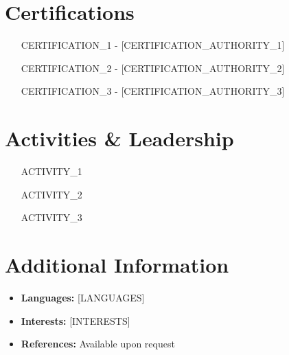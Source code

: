 \documentclass[11pt,a4paper]{article}
\begin{document}
\section{Certifications}
\begin{itemize}[leftmargin=0.2in]
    \item [CERTIFICATION_1] - [CERTIFICATION_AUTHORITY_1]
    \item [CERTIFICATION_2] - [CERTIFICATION_AUTHORITY_2]
    \item [CERTIFICATION_3] - [CERTIFICATION_AUTHORITY_3]
\end{itemize}

\section{Activities \& Leadership}
\begin{itemize}[leftmargin=0.2in]
    \item [ACTIVITY_1]
    \item [ACTIVITY_2]
    \item [ACTIVITY_3]
\end{itemize}

\section{Additional Information}
\begin{itemize}[leftmargin=0.2in]
    \item \textbf{Languages:} [LANGUAGES]
    \item \textbf{Interests:} [INTERESTS]
    \item \textbf{References:} Available upon request
\end{itemize}
\end{document}
